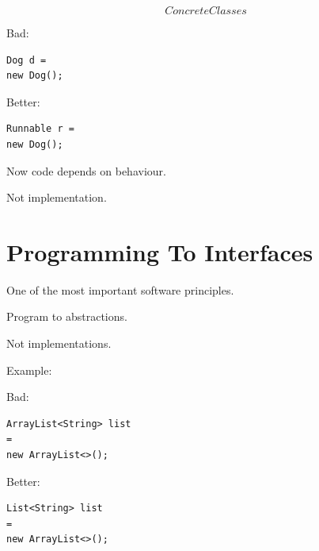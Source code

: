 \documentclass[11pt,a4paper]{book}
\begin{document}
\[
Concrete Classes
\]


Bad:

\begin{verbatim}
Dog d =
new Dog();
\end{verbatim}


Better:

\begin{verbatim}
Runnable r =
new Dog();
\end{verbatim}


Now code depends on behaviour.

Not implementation.


\section{Programming To Interfaces}

One of the most important software principles.


\begin{rosettarule}

Program to abstractions.

Not implementations.

\end{rosettarule}


Example:

Bad:

\begin{verbatim}
ArrayList<String> list
=
new ArrayList<>();
\end{verbatim}


Better:

\begin{verbatim}
List<String> list
=
new ArrayList<>();
\end{verbatim}

\end{document}
